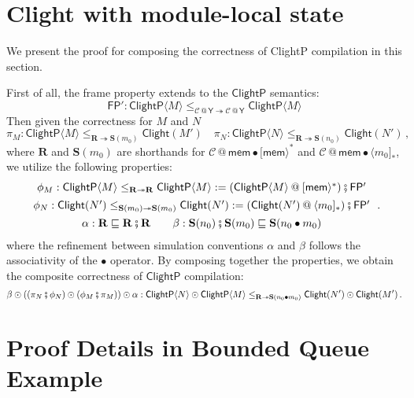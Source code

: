 \documentclass[acmsmall,screen,review,anonymous,nonacm]{acmart}
\newcommand{\kw}[1]{\ensuremath{ \mathsf{#1} }}
\newcommand{\caller}[1]{\langle #1 ]}
\newcommand{\callee}[1]{[ #1 \rangle}
\newcommand{\jr}{\mathsf{Y}}
\newcommand{\vcomp}{\fatsemi}
\begin{document}
\section{Clight with module-local state} \label{sec:appendix:clightp} %

\newcommand{\clightp}[1]{\kw{ClightP} \langle #1 \rangle}

We present the proof for
composing the correctness of ClightP compilation
in this section.

First of all,
the frame property extends to the $\kw{ClightP}$ semantics:
\[
  \kw{FP'}: \clightp{M} \le_{\mathcal{C} \mathbin@ \jr \twoheadrightarrow \mathcal{C} \mathbin@ \jr} \clightp{M}
\]
Then given the correctness for $M$ and $N$
\[
  \pi_M: \clightp{M} \le_{\mathbf{R} \twoheadrightarrow \mathbf{S}(m_0)} \kw{Clight}(M')
  \quad
  \pi_N: \clightp{N} \le_{\mathbf{R} \twoheadrightarrow \mathbf{S}(n_0)} \kw{Clight}(N')
  \,,
\]
where $\mathbf{R}$ and $\mathbf{S}(m_0)$ are shorthands for
$\mathcal{C} \mathbin@ \kw{mem} \bullet \callee{\kw{mem}}^*$
and
$\mathcal{C} \mathbin@ \kw{mem} \bullet \caller{m_0}_*$,
we utilize the following properties:
\[
  \begin{array}{c}
    \phi_M : \clightp{M} \le_{\mathbf{R} \twoheadrightarrow \mathbf{R}} \clightp{M}
    := (\clightp{M} \mathbin@ \callee{\kw{mem}}^*) \vcomp \kw{FP'}  \\[1ex]
    \phi_N : \kw{Clight}(N') \le_{\mathbf{S}(m_0) \twoheadrightarrow \mathbf{S}(m_0)} \kw{Clight}(N')
    := (\kw{Clight}(N') \mathbin@ \caller{m_0}_*) \vcomp \kw{FP'} \\[1ex]
    \alpha : \mathbf{R} \sqsubseteq \mathbf{R} \vcomp \mathbf{R}
    \qquad
    \beta : \mathbf{S}(n_0) \vcomp \mathbf{S}(m_0) \sqsubseteq \mathbf{S}(n_0 \bullet m_0)
  \end{array}
  \,.
\]
where the refinement between simulation conventions $\alpha$ and $\beta$ follows
the associativity of the $\bullet$ operator.
By composing together the properties,
we obtain the composite correctness of \kw{ClightP} compilation:
\[
  \beta \odot ((\pi_N \vcomp \phi_N) \odot (\phi_M \vcomp \pi_M) ) \odot \alpha :
  \clightp{N} \odot \clightp{M} \le_{\mathbf{R} \twoheadrightarrow \mathbf{S}(n_0 \bullet m_0)} \kw{Clight}(N') \odot \kw{Clight}(M')
  \,.
\]



\section{Proof Details in Bounded Queue Example}
\label{app:proof-bq} %
\end{document}
